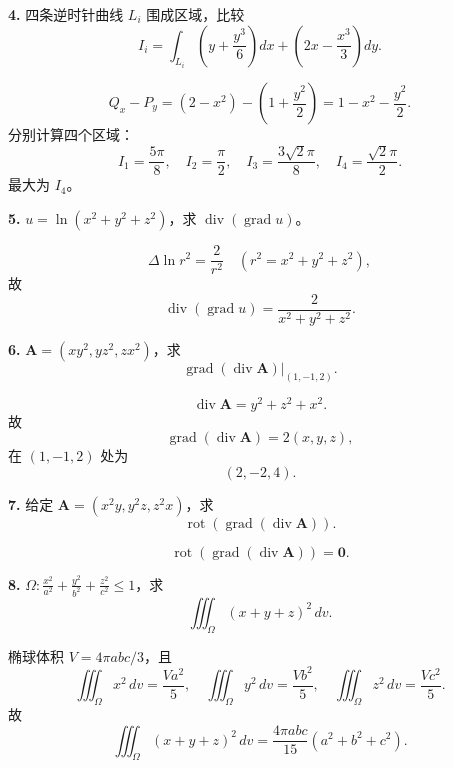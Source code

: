 \begin{problemblock}
\textbf{4.} 四条逆时针曲线 \(L_i\) 围成区域，比较
\[
I_i=\int_{L_i}\left(y+\frac{y^3}{6}\right)dx+\left(2x-\frac{x^3}{3}\right)dy.
\]
\end{problemblock}
\begin{solutionblock}
\[
Q_x-P_y=\left(2-x^2\right)-\left(1+\frac{y^2}{2}\right)
=1-x^2-\frac{y^2}{2}.
\]
分别计算四个区域：
\[
I_1=\frac{5\pi}{8},\quad I_2=\frac{\pi}{2},\quad
I_3=\frac{3\sqrt2\pi}{8},\quad I_4=\frac{\sqrt2\pi}{2}.
\]
最大为 \(I_4\)。
\end{solutionblock}

\begin{problemblock}
\textbf{5.} \(u=\ln(x^2+y^2+z^2)\)，求 \(\operatorname{div}(\operatorname{grad}u)\)。
\end{problemblock}
\begin{solutionblock}
\[
\Delta\ln r^2=\frac{2}{r^2}\quad(r^2=x^2+y^2+z^2),
\]
故
\[
\boxed{\operatorname{div}(\operatorname{grad}u)=\frac{2}{x^2+y^2+z^2}}.
\]
\end{solutionblock}

\begin{problemblock}
\textbf{6.} \(\boldsymbol A=(xy^2,yz^2,zx^2)\)，求
\[
\operatorname{grad}(\operatorname{div}\boldsymbol A)\big|_{(1,-1,2)}.
\]
\end{problemblock}
\begin{solutionblock}
\[
\operatorname{div}\boldsymbol A=y^2+z^2+x^2.
\]
故
\[
\operatorname{grad}(\operatorname{div}\boldsymbol A)=2(x,y,z),
\]
在 \((1,-1,2)\) 处为
\[
\boxed{(2,-2,4)}.
\]
\end{solutionblock}

\begin{problemblock}
\textbf{7.} 给定 \(\boldsymbol A=(x^2y,y^2z,z^2x)\)，求
\[
\operatorname{rot}(\operatorname{grad}(\operatorname{div}\boldsymbol A)).
\]
\end{problemblock}
\begin{solutionblock}
\[
\boxed{\operatorname{rot}(\operatorname{grad}(\operatorname{div}\boldsymbol A))=\boldsymbol 0}.
\]
\end{solutionblock}

\begin{problemblock}
\textbf{8.} \(\Omega:\frac{x^2}{a^2}+\frac{y^2}{b^2}+\frac{z^2}{c^2}\le1\)，求
\[
\iiint_{\Omega}(x+y+z)^2\,dv.
\]
\end{problemblock}
\begin{solutionblock}
椭球体积 \(V=4\pi abc/3\)，且
\[
\iiint_\Omega x^2\,dv=\frac{Va^2}{5},
\quad
\iiint_\Omega y^2\,dv=\frac{Vb^2}{5},
\quad
\iiint_\Omega z^2\,dv=\frac{Vc^2}{5}.
\]
故
\[
\boxed{\iiint_\Omega(x+y+z)^2\,dv
=\frac{4\pi abc}{15}(a^2+b^2+c^2)}.
\]
\end{solutionblock}

